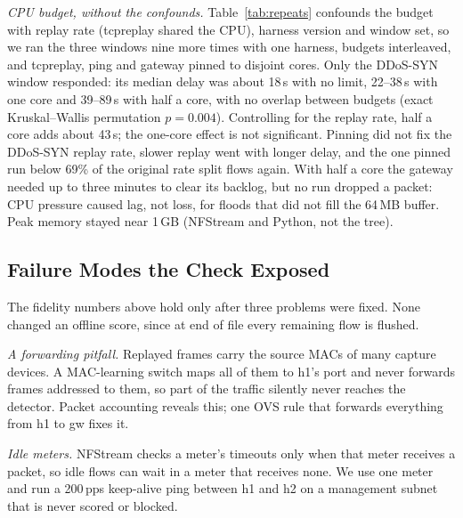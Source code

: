 \emph{CPU budget, without the confounds.} Table~\ref{tab:repeats} confounds the budget with replay rate (tcpreplay shared the CPU), harness version and window set, so we ran the three windows nine more times with one harness, budgets interleaved, and tcpreplay, ping and gateway pinned to disjoint cores. Only the DDoS-SYN window responded: its median delay was about 18\,s with no limit, 22--38\,s with one core and 39--89\,s with half a core, with no overlap between budgets (exact Kruskal--Wallis permutation $p=0.004$). Controlling for the replay rate, half a core adds about 43\,s; the one-core effect is not significant. Pinning did not fix the DDoS-SYN replay rate, slower replay went with longer delay, and the one pinned run below 69\% of the original rate split flows again. With half a core the gateway needed up to three minutes to clear its backlog, but no run dropped a packet: CPU pressure caused lag, not loss, for floods that did not fill the 64\,MB buffer. Peak memory stayed near 1\,GB (NFStream and Python, not the tree).

\subsection{Failure Modes the Check Exposed}\label{sec:defect}

The fidelity numbers above hold only after three problems were fixed. None changed an offline score, since at end of file every remaining flow is flushed.

\emph{A forwarding pitfall.} Replayed frames carry the source MACs of many capture devices. A MAC-learning switch maps all of them to h1's port and never forwards frames addressed to them, so part of the traffic silently never reaches the detector. Packet accounting reveals this; one OVS rule that forwards everything from h1 to gw fixes it.

\emph{Idle meters.} NFStream checks a meter's timeouts only when that meter receives a packet, so idle flows can wait in a meter that receives none. We use one meter and run a 200\,pps keep-alive ping between h1 and h2 on a management subnet that is never scored or blocked.

